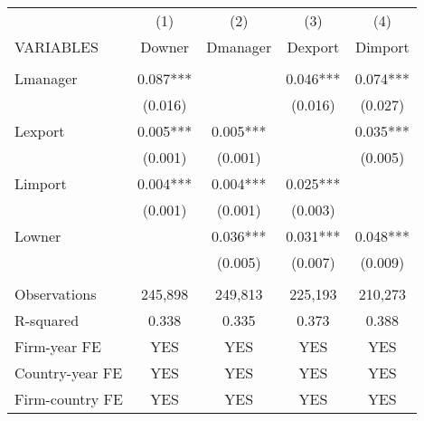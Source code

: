 \begin{tabular}{lcccc} \hline
 & (1) & (2) & (3) & (4) \\
VARIABLES & Downer & Dmanager & Dexport & Dimport \\ \hline
 &  &  &  &  \\
Lmanager & 0.087*** &  & 0.046*** & 0.074*** \\
 & (0.016) &  & (0.016) & (0.027) \\
Lexport & 0.005*** & 0.005*** &  & 0.035*** \\
 & (0.001) & (0.001) &  & (0.005) \\
Limport & 0.004*** & 0.004*** & 0.025*** &  \\
 & (0.001) & (0.001) & (0.003) &  \\
Lowner &  & 0.036*** & 0.031*** & 0.048*** \\
 &  & (0.005) & (0.007) & (0.009) \\
 &  &  &  &  \\
Observations & 245,898 & 249,813 & 225,193 & 210,273 \\
R-squared & 0.338 & 0.335 & 0.373 & 0.388 \\
Firm-year FE & YES & YES & YES & YES \\
Country-year FE & YES & YES & YES & YES \\
 Firm-country FE & YES & YES & YES & YES \\ \hline
\end{tabular}
